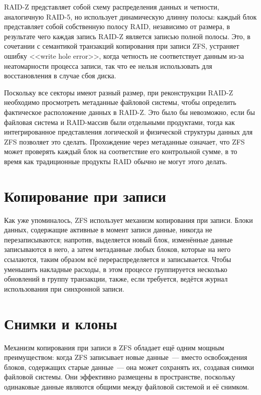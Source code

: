 \documentclass[a4page]{article}
\begin{document}
RAID-Z представляет собой схему распределения данных и четности, аналогичную RAID-5,
но использует динамическую длинну полосы: каждый блок представляет собой собственную полосу RAID,
независимо от размера, в результате чего каждая запись RAID-Z является записью полной полосы.
Это, в сочетании с семантикой транзакций копирования при записи ZFS, устраняет ошибку <<write hole error>>,
когда четность не соответствует данным из-за неатомарности процесса записи,
так что ее нельзя использовать для восстановления в случае сбоя диска.

Поскольку все секторы имеют разный размер,
при реконструкции RAID-Z необходимо просмотреть метаданные файловой системы,
чтобы определить фактическое расположение данных в RAID-Z.
Это было бы невозможно, если бы файловая система и RAID-массив были отдельными продуктами,
тогда как интегрированное представления логической и физической структуры данных для ZFS позволяет это сделать.
Прохождение через метаданные означает,
что ZFS может проверять каждый блок на соответствие его контрольной сумме,
в то время как традиционные продукты RAID обычно не могут этого делать.

\section{Копирование при записи}

Как уже упоминалось, ZFS использует механизм копирования при записи.
Блоки данных, содержащие активные в момент записи данные, никогда не перезаписываются;
напротив, выделяется новый блок, изменённые данные записываются в него,
а затем метаданные любых блоков, которые на него ссылаются,
таким образом всё перераспределяется и записывается.
Чтобы уменьшить накладные расходы, в этом процессе группируется несколько обновлений в группу транзакции,
также, если требуется, ведётся журнал использования при синхронной записи.

\section{Снимки и клоны}

Механизм копирования при записи в ZFS обладает ещё одним мощным преимуществом:
когда ZFS записывает новые данные --- вместо освобождения блоков,
содержащих старые данные --- она может сохранять их, создавая снимки файловой системы.
Они эффективно размещены в пространстве, поскольку одинаковые данные являются общими
между файловой системой и её снимком.
\end{document}
